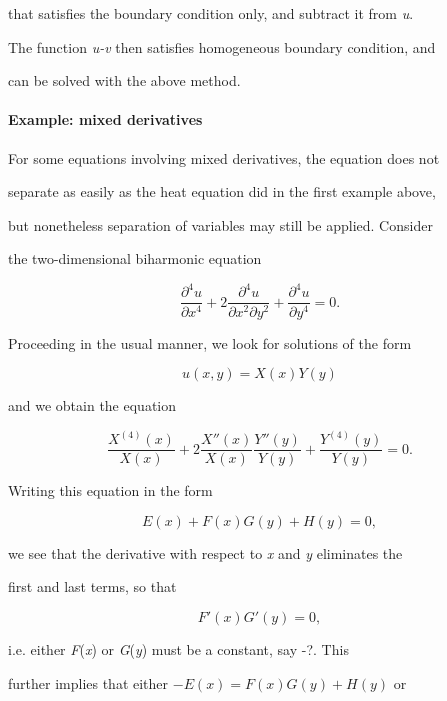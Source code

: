 that satisfies the boundary condition only, and subtract it from \textit{u}.

The function \textit{u-v} then satisfies homogeneous boundary condition, and

can be solved with the above method.



\paragraph{Example: mixed derivatives}



For some equations involving mixed derivatives, the equation does not

separate as easily as the heat equation did in the first example above,

but nonetheless separation of variables may still be applied. Consider

the two-dimensional biharmonic equation



$$\frac{\partial^4 u}{\partial x^4} + 2\frac{\partial^4 u}{\partial x^2\partial y^2} + \frac{\partial^4 u}{\partial y^4} = 0.$$



Proceeding in the usual manner, we look for solutions of the form



$$u(x,y) = X(x)Y(y)$$



and we obtain the equation



$$\frac{X^{(4)}(x)}{X(x)} + 2\frac{X''(x)}{X(x)}\frac{Y''(y)}{Y(y)} + \frac{Y^{(4)}(y)}{Y(y)} = 0.$$



Writing this equation in the form



$$E(x) + F(x)G(y) + H(y) = 0,$$



we see that the derivative with respect to \textit{x} and \textit{y} eliminates the

first and last terms, so that



$$F'(x)G'(y) = 0,$$



i.e. either \textit{F}(\textit{x}) or \textit{G}(\textit{y}) must be a constant, say -?. This

further implies that either $-E(x)=F(x)G(y)+H(y)$ or

